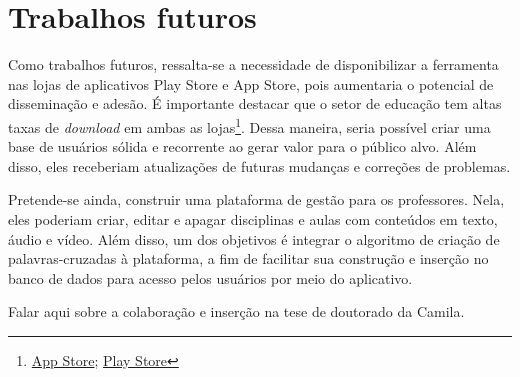 \chapter{Trabalhos futuros} \label{sec:atividades_futuras}
Como trabalhos futuros, ressalta-se a necessidade de  disponibilizar a ferramenta nas lojas de aplicativos Play Store e App Store, pois aumentaria o potencial de disseminação e adesão. É importante destacar que o setor de educação tem altas taxas de \textit{download} em ambas as lojas\footnote{\href{https://www.statista.com/statistics/270291/popular-categories-in-the-app-store/}{App Store};  \href{https://www.statista.com/statistics/279286/google-play-android-app-categories/}{Play Store}}. Dessa maneira, seria possível criar uma base de usuários sólida e recorrente ao gerar valor para o público alvo. Além disso, eles receberiam atualizações de futuras mudanças e correções de problemas.

Pretende-se ainda, construir uma plataforma de gestão para os professores. Nela, eles poderiam criar, editar e apagar disciplinas e aulas com conteúdos em texto, áudio e vídeo. Além disso, um dos objetivos é integrar o algoritmo de criação de palavras-cruzadas à plataforma, a fim de facilitar sua construção e inserção no banco de dados para acesso pelos usuários por meio do aplicativo.

Falar aqui sobre a colaboração e inserção na tese de doutorado da Camila.
